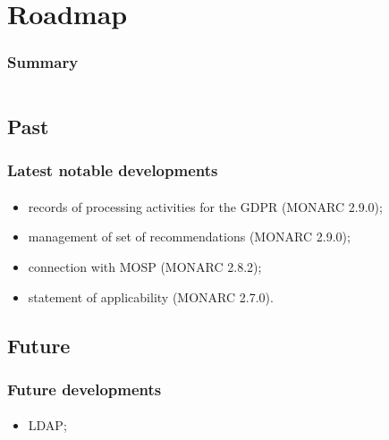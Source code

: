 %
%
\section{Roadmap}
\begin{frame}
    \frametitle{Summary}
    \begin{columns}[t]
        \begin{column}{5cm}
            \tableofcontents[sections={1-3}, currentsection, hideothersubsections]
        \end{column}
        \begin{column}{5cm}
            \tableofcontents[sections={4-5}, currentsection, hideothersubsections]
        \end{column}
    \end{columns}
\end{frame}

\subsection{Past}
\begin{frame}
    \frametitle{Latest notable developments}
    \framesubtitle{}
    \begin{itemize}
        \item records of processing activities for the GDPR (MONARC 2.9.0);
        \item management of set of recommendations (MONARC 2.9.0);
        \item connection with MOSP (MONARC 2.8.2);
        \item statement of applicability (MONARC 2.7.0).
    \end{itemize}
\end{frame}

\subsection{Future}
\begin{frame}
    \frametitle{Future developments}
    \framesubtitle{}
    \begin{itemize}
        \item LDAP;
    \end{itemize}
\end{frame} 
